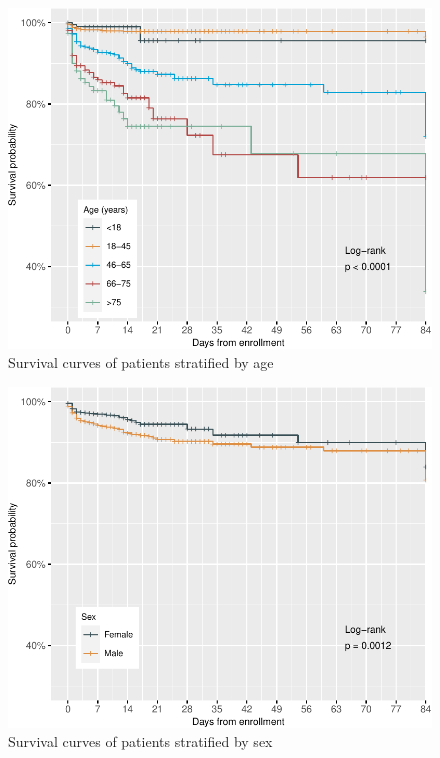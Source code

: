 \documentclass[
  10pt,
]{article}
\begin{document}
\begin{figure}[h]

{\centering \includegraphics{results_files/figure-latex/age-1} 

}

\caption{Survival curves of patients stratified by age}\label{fig:age}
\end{figure}

\newpage

\begin{figure}[h]

{\centering \includegraphics{results_files/figure-latex/sex-1} 

}

\caption{Survival curves of patients stratified by sex}\label{fig:sex}
\end{figure}
\end{document}

